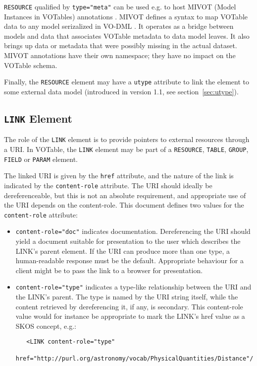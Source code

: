 \documentclass[11pt,a4paper]{ivoa}
\def\Aref#1{section~\ref{#1}}
\let\fg=\color
\def\attr#1{{\tt{\fg{DarkRed}#1}}}
\def\elem#1{{\tt{\fg{DarkRed}#1}}}
\def\attrval#1#2{{\tt{\fg{DarkRed}#1}="{\fg{DarkPurple}#2}"}}
\begin{document}
\elem{RESOURCE} qualified by \attrval{type}{meta} can be used e.g. to host
MIVOT (Model Instances in VOTables) annotations \citep{2023ivoa.spec.0620M}.
MIVOT defines a syntax to map VOTable
data to any model serizalized in VO-DML \citep{2018ivoa.spec.0910L}.
It operates as a bridge between models and data that associates VOTable
metadata to data model leaves.
It also brings up data or metadata that were possibly missing in the actual dataset.
MIVOT annotations have their own namespace; they have no impact on the VOTable schema.

Finally, the \elem{RESOURCE} element may have a \attr{utype} attribute
to link the element to some external data model
(introduced in version 1.1, see \Aref{sec:utype}).

\subsection{\elem{LINK} Element}
\label{sec:link}
\label{elem:LINK}

The role of the {\elem{LINK}} element is to provide pointers
to external resources
through a URI. In VOTable, the {\elem{LINK}}
element may be part of a {\elem{RESOURCE}},
{\elem{TABLE}}, \elem{GROUP}, {\elem{FIELD}} or \elem{PARAM} element.

The linked URI is given by the \attr{href} attribute,
and the nature of the link is indicated by the \attr{content-role} attribute.
The URI should ideally be dereferenceable,
but this is not an absolute requirement,
and appropriate use of the URI depends on the content-role.
This document defines two values for the \attr{content-role} attribute:

\begin{itemize}
\item \attrval{content-role}{doc} indicates documentation.
      Dereferencing the URI should yield a document suitable for
      presentation to the user which describes the LINK's parent element.
      If the URI can produce more than one type, a human-readable response
      must be the default.
      Appropriate behaviour for a client might be to pass the link to a browser
      for presentation.

\item \attrval{content-role}{type} indicates a type-like relationship
      between the URI and the LINK's parent.
      The type is named by the URI string itself,
      while the content retrieved by dereferencing it, if any, is secondary.
      This content-role value would for instance be appropriate
      to mark the LINK's href value as a SKOS concept, e.g.:
      \begin{verbatim}
   <LINK content-role="type"
         href="http://purl.org/astronomy/vocab/PhysicalQuantities/Distance"/>
      \end{verbatim}
\end{itemize}
\end{document}
